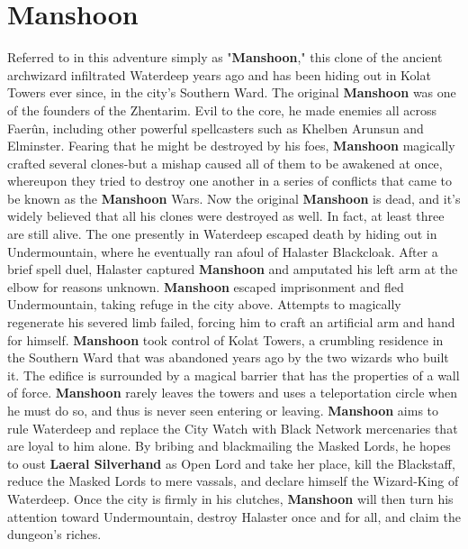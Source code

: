 \documentclass[10pt,a4paper,twoside,twocolumn,openany,nodeprecatedcode]{dndbook}
\begin{document}
\section{Manshoon}
Referred to in this adventure simply as "\textbf{Manshoon}," this clone of the ancient archwizard infiltrated Waterdeep years ago and has been hiding out in Kolat Towers ever since, in the city's Southern Ward.
The original \textbf{Manshoon} was one of the founders of the Zhentarim. Evil to the core, he made enemies all across Faerûn, including other powerful spellcasters such as Khelben Arunsun and Elminster. Fearing that he might be destroyed by his foes, \textbf{Manshoon} magically crafted several clones-but a mishap caused all of them to be awakened at once, whereupon they tried to destroy one another in a series of conflicts that came to be known as the \textbf{Manshoon} Wars.
Now the original \textbf{Manshoon} is dead, and it's widely believed that all his clones were destroyed as well. In fact, at least three are still alive. The one presently in Waterdeep escaped death by hiding out in Undermountain, where he eventually ran afoul of Halaster Blackcloak. After a brief spell duel, Halaster captured \textbf{Manshoon} and amputated his left arm at the elbow for reasons unknown. \textbf{Manshoon} escaped imprisonment and fled Undermountain, taking refuge in the city above. Attempts to magically regenerate his severed limb failed, forcing him to craft an artificial arm and hand for himself.
\textbf{Manshoon} took control of Kolat Towers, a crumbling residence in the Southern Ward that was abandoned years ago by the two wizards who built it. The edifice is surrounded by a magical barrier that has the properties of a wall of force. \textbf{Manshoon} rarely leaves the towers and uses a teleportation circle when he must do so, and thus is never seen entering or leaving.
\textbf{Manshoon} aims to rule Waterdeep and replace the City Watch with Black Network mercenaries that are loyal to him alone. By bribing and blackmailing the Masked Lords, he hopes to oust \textbf{Laeral Silverhand} as Open Lord and take her place, kill the Blackstaff, reduce the Masked Lords to mere vassals, and declare himself the Wizard-King of Waterdeep. Once the city is firmly in his clutches, \textbf{Manshoon} will then turn his attention toward Undermountain, destroy Halaster once and for all, and claim the dungeon's riches.
\end{document}
